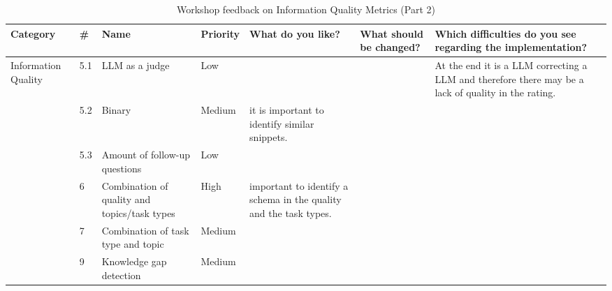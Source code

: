 \documentclass[
	english,
	ruledheaders=section,%
	class=report,%
	thesis={type=bachelor},%
	accentcolor=1b,%
	custommargins=true,%
	marginpar=false,%
	parskip=half-,%
	fontsize=11pt,%
	DIV=14,
]{tudapub}
\begin{document}
\begin{table}
    \centering
    \small 
    \caption{Workshop feedback on Information Quality Metrics (Part 2)}
    \label{tab:info_quality_p2}
    \begin{tabularx}{\textheight}{p{2.2cm} l >{\RaggedRight\arraybackslash}X l >{\RaggedRight\arraybackslash}X >{\RaggedRight\arraybackslash}X >{\RaggedRight\arraybackslash}X}
        \toprule
        \textbf{Category} & \textbf{\#} & \textbf{Name} & \textbf{Priority} & \textbf{What do you like?} & \textbf{What should be changed?} & \textbf{Which difficulties do you see regarding the implementation?} \\
        \midrule
        \multirow{6}{=}{Information Quality} 
        & 5.1 & LLM as a judge & Low & & & At the end it is a LLM correcting a LLM and therefore there may be a lack of quality in the rating. \\
        \cmidrule(l){2-7}
        & 5.2 & Binary & Medium & it is important to identify similar snippets. & & \\
        \cmidrule(l){2-7}
        & 5.3 & Amount of follow-up questions & Low & & & \\
        \cmidrule(l){2-7}
        & 6 & Combination of quality and topics/task types & High & important to identify a schema in the quality and the task types. & & \\
        \cmidrule(l){2-7}
        & 7 & Combination of task type and topic & Medium & & & \\
        \cmidrule(l){2-7}
        & 9 & Knowledge gap detection & Medium & & & \\
        \bottomrule
    \end{tabularx}
\end{table}
\end{document}
